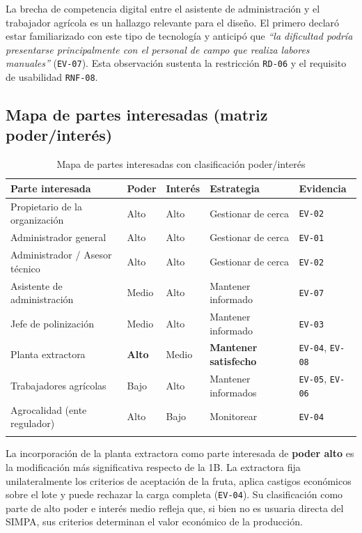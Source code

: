 \documentclass[11pt,a4paper]{article}
\newcommand{\id}[1]{\texttt{\begingroup\hyphenpenalty=10000\relax#1\endgroup}}
\renewcommand{\id}[1]{\texttt{#1}}
\begin{document}
\noindent
La brecha de competencia digital entre el asistente de administración y el trabajador agrícola es
un hallazgo relevante para el diseño. El primero declaró estar familiarizado con este tipo de
tecnología y anticipó que \emph{``la dificultad podría presentarse principalmente con el personal de
campo que realiza labores manuales''} (\id{EV-07}). Esta observación sustenta la restricción
\id{RD-06} y el requisito de usabilidad \id{RNF-08}.

\subsection{Mapa de partes interesadas (matriz poder/interés)}

\begin{longtable}{|L{4.2cm}|C{1.8cm}|C{1.8cm}|L{3.4cm}|C{2.2cm}|}
\hline
{}\textbf{Parte interesada} & \textbf{Poder} & \textbf{Interés} & \textbf{Estrategia} & \textbf{Evidencia} \\
\hline
\endhead
Propietario de la organización & Alto & Alto & Gestionar de cerca & \id{EV-02} \\ \hline
Administrador general & Alto & Alto & Gestionar de cerca & \id{EV-01} \\ \hline
Administrador / Asesor técnico & Alto & Alto & Gestionar de cerca & \id{EV-02} \\ \hline
Asistente de administración & Medio & Alto & Mantener informado & \id{EV-07} \\ \hline
Jefe de polinización & Medio & Alto & Mantener informado & \footnotesize \id{EV-03} \\ \hline
Planta extractora & \textbf{Alto} & Medio & \textbf{Mantener satisfecho} & \id{EV-04}, \id{EV-08} \\ \hline
Trabajadores agrícolas & Bajo & Alto & Mantener informados & \id{EV-05}, \id{EV-06} \\ \hline
Agrocalidad (ente regulador) & Alto & Bajo & Monitorear & \footnotesize \id{EV-04} \\ \hline
\caption{Mapa de partes interesadas con clasificación poder/interés}
\end{longtable}

\noindent
La incorporación de la planta extractora como parte interesada de \textbf{poder alto} es la
modificación más significativa respecto de la 1B. La extractora fija unilateralmente los criterios
de aceptación de la fruta, aplica castigos económicos sobre el lote y puede rechazar la carga
completa (\id{EV-04}). Su clasificación como parte de alto poder e interés medio refleja que, si
bien no es usuaria directa del SIMPA, sus criterios determinan el valor económico de la producción.
\end{document}
